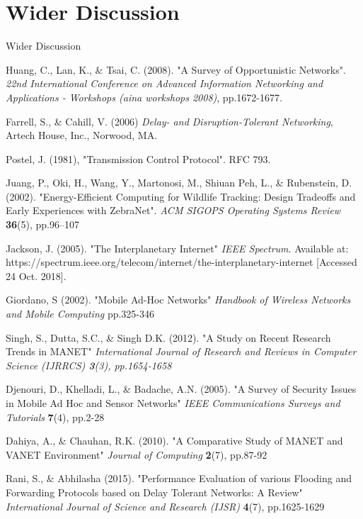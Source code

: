 \documentclass{article}
\begin{document}
\section{Wider Discussion}
Wider Discussion

\begin{thebibliography}{20}

Huang, C., Lan, K., \& Tsai, C. (2008). 
"A Survey of Opportunistic Networks". 
\textit{22nd International Conference on Advanced Information Networking and Applications - Workshops (aina workshops 2008)}, pp.1672-1677.

Farrell, S., \& Cahill, V. (2006) \textit{Delay- and Disruption-Tolerant Networking}, Artech House, Inc., Norwood, MA.

Postel, J. (1981), "Transmission Control Protocol". RFC 793.

Juang, P., Oki, H., Wang, Y., Martonosi, M., Shiuan Peh, L., \& Rubenstein, D. (2002).
"Energy-Efficient Computing for Wildlife Tracking: Design Tradeoffs and Early Experiences with ZebraNet".
\textit{ACM SIGOPS Operating Systems Review} \textbf{36}(5), pp.96–107

Jackson, J. (2005). 
"The Interplanetary Internet"
\textit{IEEE Spectrum}. Available at: https://spectrum.ieee.org/telecom/internet/the-interplanetary-internet [Accessed 24 Oct. 2018].

Giordano, S (2002).
"Mobile Ad-Hoc Networks"
\textit{Handbook of Wireless Networks and Mobile Computing} pp.325-346

Singh, S., Dutta, S.C., \& Singh D.K. (2012). 
"A Study on Recent Research Trends in MANET"
\textit{International Journal of Research and Reviews in Computer Science (IJRRCS) \textbf{3}(3), pp.1654-1658} 

Djenouri, D., Khelladi, L., \& Badache, A.N. (2005).
"A Survey of Security Issues in Mobile Ad Hoc and Sensor Networks"
\textit{IEEE Communications Surveys and Tutorials} \textbf{7}(4), pp.2-28

Dahiya, A., \& Chauhan, R.K. (2010).
"A Comparative Study of MANET and VANET Environment"
\textit{Journal of Computing} \textbf{2}(7), pp.87-92

Rani, S., \& Abhilasha (2015).
"Performance Evaluation of various Flooding and
Forwarding Protocols based on Delay Tolerant
Networks: A Review"
\textit{International Journal of Science and Research (IJSR)} \textbf{4}(7), pp.1625-1629


\end{thebibliography}
\end{document}
